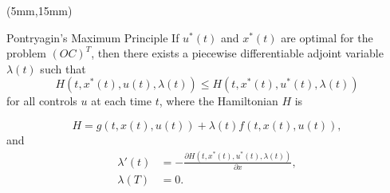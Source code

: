 \documentclass[10pt]{beamer}
\begin{document}
\begin{frame}
	\begin{textblock*}{120mm}(5mm,15mm)
		\begin{graybox}{Pontryagin’s Maximum Principle}
			If $u^*(t)$ and $x^*(t)$ are optimal for the problem $(OC)^T$, then there exists a piecewise differentiable adjoint variable $\lambda(t)$ such that
				\begin{equation*}
					H(t,x^*(t),u(t),\lambda(t))\leq H(t,x^*(t),u^*(t),\lambda(t))
				\end{equation*}
			for all controls $u$ at each time $t$, where the Hamiltonian $H$ is
			
				\begin{equation*}
					H=g(t,x(t),u(t))+\lambda(t)f(t,x(t),u(t)),
				\end{equation*}
			and 
				\begin{align*}
					\lambda'(t) &= -\frac{\partial H(t,x^*(t),u^*(t),\lambda(t))}{\partial x},\\
					\lambda(T) &= 0.
				\end{align*}
		\end{graybox}
		
	\end{textblock*}
	
\end{frame}
\end{document}

